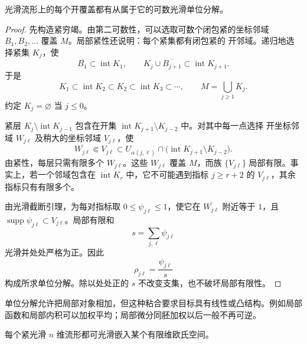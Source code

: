 \begin{theorem}[光滑单位分解]\label{thm:smooth-partition-of-unity}
光滑流形上的每个开覆盖都有从属于它的可数光滑单位分解。
\end{theorem}

\begin{proof}
先构造紧穷竭。由第二可数性，可以选取可数个闭包紧的坐标邻域
\(B_1,B_2,\ldots\) 覆盖 \(M\)。局部紧性还说明：每个紧集都有闭包紧的
开邻域。递归地选择紧集 \(K_j\)，使
\[
 \overline{B_1}\subset\operatorname{int}K_1,\qquad
 K_j\cup\overline{B_{j+1}}\subset\operatorname{int}K_{j+1}.
\]
于是
\[
 K_1\subset\operatorname{int}K_2\subset K_2
 \subset\operatorname{int}K_3\subset\cdots,\qquad
 M=\bigcup_{j\ge1}K_j.
\]
约定 \(K_j=\varnothing\) 当 \(j\le0\)。

紧层 \(K_j\setminus\operatorname{int}K_{j-1}\) 包含在开集
\(\operatorname{int}K_{j+1}\setminus K_{j-2}\) 中。对其中每一点选择
开坐标邻域 \(W_{j\ell}\) 及稍大的坐标邻域 \(V_{j\ell}\)，使
\[
 \overline{W_{j\ell}}\Subset V_{j\ell}
 \subset U_{\alpha(j,\ell)}\cap
 \bigl(\operatorname{int}K_{j+1}\setminus K_{j-2}\bigr).
\]
由紧性，每层只需有限多个 \(W_{j\ell}\)。这些 \(W_{j\ell}\) 覆盖
\(M\)，而族 \(\{V_{j\ell}\}\) 局部有限。事实上，若一个邻域包含在
\(\operatorname{int}K_r\) 中，它不可能遇到指标 \(j\ge r+2\) 的
\(V_{j\ell}\)，其余指标只有有限多个。

由光滑截断引理，为每对指标取 \(0\le\psi_{j\ell}\le1\)，使它在
\(\overline{W_{j\ell}}\) 附近等于 \(1\)，且
\(\operatorname{supp}\psi_{j\ell}\subset V_{j\ell}\)。局部有限和
\[
 s=\sum_{j,\ell}\psi_{j\ell}
\]
光滑并处处严格为正。因此
\[
 \rho_{j\ell}=\frac{\psi_{j\ell}}{s}
\]
构成所求单位分解。除以处处正的 \(s\) 不改变支集，也不破坏局部有限性。
\end{proof}

单位分解允许把局部对象相加，但这种粘合要求目标具有线性或凸结构。例如局部
函数和局部内积可以加权平均；局部微分同胚加权以后一般不再可逆。

\begin{theorem}[紧流形的有限维嵌入]\label{thm:compact-manifold-elementary-embedding}
每个紧光滑 \(n\) 维流形都可光滑嵌入某个有限维欧氏空间。
\end{theorem}

